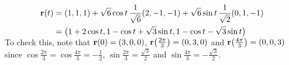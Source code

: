 \begin{eg}
\begin{align*}
\mathbf{r}(t)&=(1,1,1)+\sqrt{6}\cos t\,\frac{1}{\sqrt{6}}(2,-1,-1)
        + \sqrt{6}\sin t\,\frac{1}{\sqrt{2}}(0,1,-1)\cr
&=\big(1+2\cos t, 1-\cos t+\sqrt{3}\sin t,1-\cos t-\sqrt{3}\sin t\big)\\[-0.1in]
\end{align*}
To check this, note that $\mathbf{r}(0)=(3,0,0)$, 
$\mathbf{r}\big(\frac{2\pi}{3}\big)=(0,3,0)$
and $\mathbf{r}\big(\frac{4\pi}{3}\big)=(0,0,3)$ since 
$\cos\frac{2\pi}{3}=\cos\frac{4\pi}{3}=-\frac{1}{2}$,
$\sin\frac{2\pi}{3}=\frac{\sqrt{3}}{2}$ and
$\sin\frac{4\pi}{3}=-\frac{\sqrt{3}}{2}$.

\end{eg}




